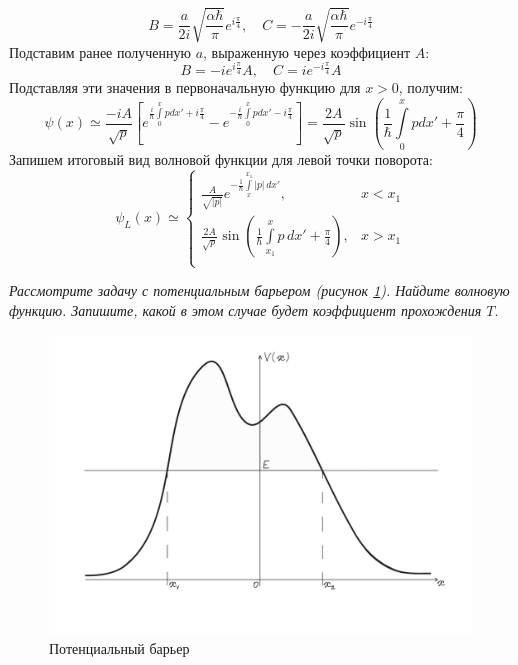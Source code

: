 \[
B = \frac{a}{2i}\sqrt{\frac{\alpha\hbar}{\pi}}e^{i\frac{\pi}{4}},\quad C = -\frac{a}{2i}\sqrt{\frac{\alpha\hbar}{\pi}}e^{-i\frac{\pi}{4}}
\]
Подставим ранее полученную $a$, выраженную через коэффициент $A$:
\[
B = -ie^{i\frac{\pi}{4}}A,\quad C = ie^{-i\frac{\pi}{4}}A
\]
Подставляя эти значения в первоначальную функцию для $x>0$, получим:
\[
\psi(x) \simeq \frac{-iA}{\sqrt{p}}\left[ e^{\frac{i}{\hbar}\int\limits_{0}^{x} p dx' + i\frac{\pi}{4}} - e^{-\frac{i}{\hbar}\int\limits_{0}^{x} p dx' - i\frac{\pi}{4}} \right] = \frac{2A}{\sqrt{p}}\sin\left( \frac{1}{\hbar} \int\limits_0^{x}p dx' + \frac{\pi}{4} \right)
\]
Запишем итоговый вид волновой функции для левой точки поворота:
\[
\psi_L(x) \simeq 
\begin{cases}
    \frac{A}{\sqrt{|p|}}e^{-\frac{1}{\hbar} \int\limits_{x}^{x_1} |p|\,dx'}, & x < x_1\\
    \frac{2A}{\sqrt{p}}\sin\left( \frac{1}{\hbar} \int\limits_{x_1}^{x} p\,dx' + \frac{\pi}{4} \right), & x > x_1\\
\end{cases}
\]
\newpage
{}
\begin{center}
\textit{Рассмотрите задачу с потенциальным барьером (рисунок \ref{fig C.2}). Найдите волновую функцию. Запишите, какой в этом случае будет коэффициент прохождения $T$}.
\end{center}

\begin{figure}[h!]
\centering
\includegraphics[scale=0.16]{appendix/images/barier.jpg}
\caption{Потенциальный барьер}
\label{fig C.2}
\end{figure}

